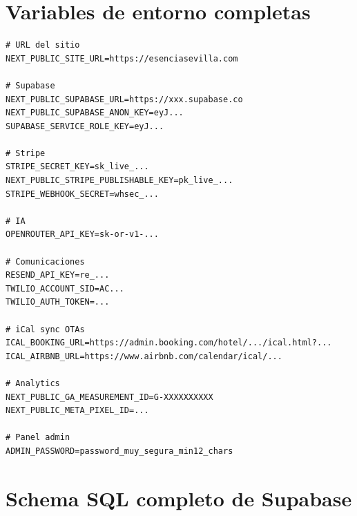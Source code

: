 \documentclass[12pt,a4paper,twoside,openright]{report}
\begin{document}
\appendix

\chapter{Variables de entorno completas}

\begin{lstlisting}[style=bashStyle]
# URL del sitio
NEXT_PUBLIC_SITE_URL=https://esenciasevilla.com

# Supabase
NEXT_PUBLIC_SUPABASE_URL=https://xxx.supabase.co
NEXT_PUBLIC_SUPABASE_ANON_KEY=eyJ...
SUPABASE_SERVICE_ROLE_KEY=eyJ...

# Stripe
STRIPE_SECRET_KEY=sk_live_...
NEXT_PUBLIC_STRIPE_PUBLISHABLE_KEY=pk_live_...
STRIPE_WEBHOOK_SECRET=whsec_...

# IA
OPENROUTER_API_KEY=sk-or-v1-...

# Comunicaciones
RESEND_API_KEY=re_...
TWILIO_ACCOUNT_SID=AC...
TWILIO_AUTH_TOKEN=...

# iCal sync OTAs
ICAL_BOOKING_URL=https://admin.booking.com/hotel/.../ical.html?...
ICAL_AIRBNB_URL=https://www.airbnb.com/calendar/ical/...

# Analytics
NEXT_PUBLIC_GA_MEASUREMENT_ID=G-XXXXXXXXXX
NEXT_PUBLIC_META_PIXEL_ID=...

# Panel admin
ADMIN_PASSWORD=password_muy_segura_min12_chars
\end{lstlisting}

\chapter{Schema SQL completo de Supabase}
\end{document}
